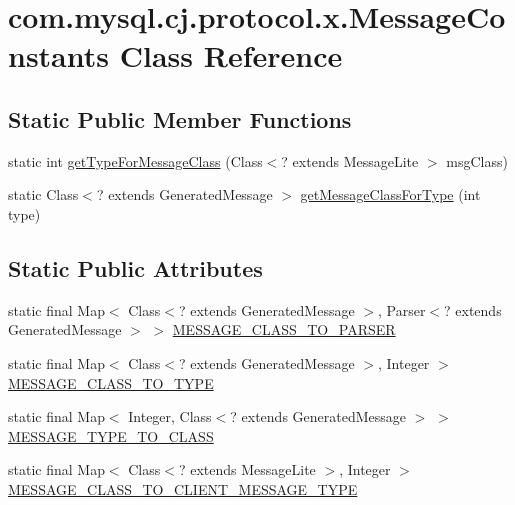 \hypertarget{classcom_1_1mysql_1_1cj_1_1protocol_1_1x_1_1_message_constants}{}\section{com.\+mysql.\+cj.\+protocol.\+x.\+Message\+Constants Class Reference}
\label{classcom_1_1mysql_1_1cj_1_1protocol_1_1x_1_1_message_constants}
\subsection*{Static Public Member Functions}
\begin{DoxyCompactItemize}
\item 
static int \mbox{\hyperlink{classcom_1_1mysql_1_1cj_1_1protocol_1_1x_1_1_message_constants_a669e4c77f9271db3a03dfdbabe9f8687}{get\+Type\+For\+Message\+Class}} (Class$<$? extends Message\+Lite $>$ msg\+Class)
\item 
static Class$<$? extends Generated\+Message $>$ \mbox{\hyperlink{classcom_1_1mysql_1_1cj_1_1protocol_1_1x_1_1_message_constants_a8fa1b651d83c91c9b422c2713cb64cb5}{get\+Message\+Class\+For\+Type}} (int type)
\end{DoxyCompactItemize}
\subsection*{Static Public Attributes}
\begin{DoxyCompactItemize}
\item 
static final Map$<$ Class$<$? extends Generated\+Message $>$, Parser$<$? extends Generated\+Message $>$ $>$ \mbox{\hyperlink{classcom_1_1mysql_1_1cj_1_1protocol_1_1x_1_1_message_constants_a672753dee2c3aca2ebfa6674e9a1d817}{M\+E\+S\+S\+A\+G\+E\+\_\+\+C\+L\+A\+S\+S\+\_\+\+T\+O\+\_\+\+P\+A\+R\+S\+ER}}
\item 
static final Map$<$ Class$<$? extends Generated\+Message $>$, Integer $>$ \mbox{\hyperlink{classcom_1_1mysql_1_1cj_1_1protocol_1_1x_1_1_message_constants_a6e1a08970c307a0216218b785569059c}{M\+E\+S\+S\+A\+G\+E\+\_\+\+C\+L\+A\+S\+S\+\_\+\+T\+O\+\_\+\+T\+Y\+PE}}
\item 
static final Map$<$ Integer, Class$<$? extends Generated\+Message $>$ $>$ \mbox{\hyperlink{classcom_1_1mysql_1_1cj_1_1protocol_1_1x_1_1_message_constants_afcd94ad22ee22dcac79ee95c4473db49}{M\+E\+S\+S\+A\+G\+E\+\_\+\+T\+Y\+P\+E\+\_\+\+T\+O\+\_\+\+C\+L\+A\+SS}}
\item 
static final Map$<$ Class$<$? extends Message\+Lite $>$, Integer $>$ \mbox{\hyperlink{classcom_1_1mysql_1_1cj_1_1protocol_1_1x_1_1_message_constants_ae1faf0f44c737fc14dbc49b51b82bcea}{M\+E\+S\+S\+A\+G\+E\+\_\+\+C\+L\+A\+S\+S\+\_\+\+T\+O\+\_\+\+C\+L\+I\+E\+N\+T\+\_\+\+M\+E\+S\+S\+A\+G\+E\+\_\+\+T\+Y\+PE}}
\end{DoxyCompactItemize}


